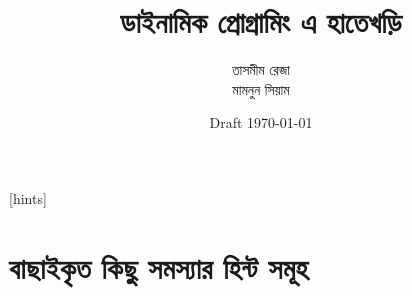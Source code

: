 \documentclass[twoside,12pt,a4paper]{book}
\title{\Huge ডাইনামিক প্রোগ্রামিং এ হাতেখড়ি}
\author{\Large তাসমীম রেজা \\ \Large মামনুন সিয়াম}
\date{Draft \today}
\theoremstyle{definition}
\theoremstyle{definition}
\theoremstyle{definition}
\theoremstyle{definition}
\theoremstyle{definition}
\theoremstyle{definition}
\theoremstyle{definition}
\theoremstyle{definition}
\theoremstyle{definition}
\theoremstyle{definition}
\theoremstyle{definition}
\theoremstyle{definition}
\theoremstyle{definition}
\theoremstyle{definition}
\theoremstyle{definition}
\theoremstyle{definition}
\theoremstyle{definition}
\theoremstyle{definition}
\begin{document}
\frontmatter
\maketitle

\mainmatter

% 
% 
% 

[hints]

% 










\part{বাছাইকৃত কিছু সমস্যার হিন্ট সমূহ}



% 
% 
\end{document}
